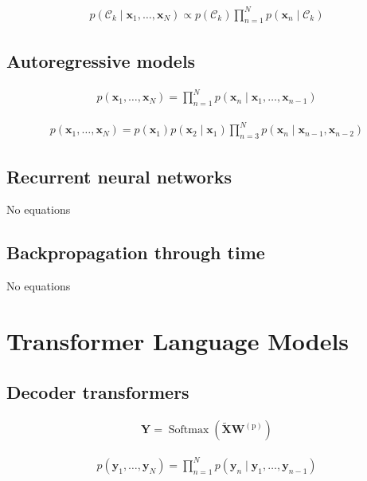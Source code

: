 \documentclass{article}
\begin{document}
\begin{align*}
p\left(\mathcal{C}_{k} \mid \mathbf{x}_{1}, \ldots, \mathbf{x}_{N}\right) \propto p\left(\mathcal{C}_{k}\right) \prod_{n=1}^{N} p\left(\mathbf{x}_{n} \mid \mathcal{C}_{k}\right) \tag{12.30}
\end{align*}

\subsection{Autoregressive models}
\begin{align*}
p\left(\mathbf{x}_{1}, \ldots, \mathbf{x}_{N}\right)=\prod_{n=1}^{N} p\left(\mathbf{x}_{n} \mid \mathbf{x}_{1}, \ldots, \mathbf{x}_{n-1}\right) \tag{12.31}
\end{align*}

\begin{align*}
p\left(\mathbf{x}_{1}, \ldots, \mathbf{x}_{N}\right)=p\left(\mathbf{x}_{1}\right) p\left(\mathbf{x}_{2} \mid \mathbf{x}_{1}\right) \prod_{n=3}^{N} p\left(\mathbf{x}_{n} \mid \mathbf{x}_{n-1}, \mathbf{x}_{n-2}\right) \tag{12.32}
\end{align*}

\subsection{Recurrent neural networks}
No equations

\subsection{Backpropagation through time}
No equations

\section{Transformer Language Models}

\subsection{Decoder transformers}
\begin{align*}
\mathbf{Y}=\operatorname{Softmax}\left(\widetilde{\mathbf{X}} \mathbf{W}^{(\mathrm{p})}\right) \tag{12.33}
\end{align*}

\begin{align*}
p\left(\mathbf{y}_{1}, \ldots, \mathbf{y}_{N}\right)=\prod_{n=1}^{N} p\left(\mathbf{y}_{n} \mid \mathbf{y}_{1}, \ldots, \mathbf{y}_{n-1}\right) \tag{12.34}
\end{align*}
\end{document}
